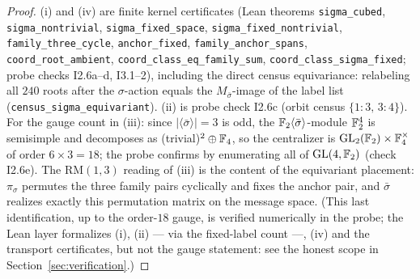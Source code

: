 \begin{proof}
\sloppy
(i) and (iv) are finite kernel certificates (Lean theorems
\texttt{sigma\_cubed}, \texttt{sigma\_nontrivial},
\texttt{sigma\_fixed\_space}, \texttt{sigma\_fixed\_nontrivial},
\texttt{family\_three\_cycle}, \texttt{anchor\_fixed},
\texttt{family\_anchor\_spans}, \texttt{coord\_root\_ambient},
\texttt{coord\_class\_eq\_family\_sum},
\texttt{coord\_class\_sigma\_fixed}; probe checks I2.6a--d, I3.1--2),
including the direct census equivariance: relabeling all $240$ roots
after the $\sigma$-action equals the $M_{\bar\sigma}$-image of the
label list (\texttt{census\_sigma\_equivariant}).  (ii) is probe
check I2.6c (orbit census $\{1\colon3,\,3\colon4\}$).  For the gauge
count in (iii): since $|\langle\bar\sigma\rangle|=3$ is odd, the
$\mathbb F_2\langle\bar\sigma\rangle$-module $\mathbb F_2^4$ is semisimple and
decomposes as (trivial)$^2\oplus\mathbb F_4$, so the centralizer is
$\operatorname{GL}_2(\mathbb F_2)\times\mathbb F_4^\times$ of order $6\times3=18$; the probe
confirms by enumerating all of $\operatorname{GL}(4,\mathbb F_2)$ (check I2.6e).  The
$\mathrm{RM}(1,3)$ reading of (iii) is the content of the equivariant
placement: $\pi_\sigma$ permutes the three family pairs cyclically
and fixes the anchor pair, and $\bar\sigma$ realizes exactly this
permutation matrix on the message space.  (This last identification,
up to the order-$18$ gauge, is verified numerically in the probe; the
Lean layer formalizes (i), (ii) --- via the fixed-label count ---,
(iv) and the transport certificates, but not the gauge statement:
see the honest scope in Section~\ref{sec:verification}.)
\end{proof}

